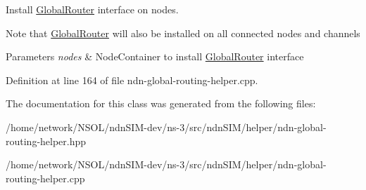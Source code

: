 Install \hyperlink{classns3_1_1ndn_1_1GlobalRouter}{Global\+Router} interface on nodes. 

Note that \hyperlink{classns3_1_1ndn_1_1GlobalRouter}{Global\+Router} will also be installed on all connected nodes and channels


\begin{DoxyParams}{Parameters}
{\em nodes} & Node\+Container to install \hyperlink{classns3_1_1ndn_1_1GlobalRouter}{Global\+Router} interface \\
\hline
\end{DoxyParams}


Definition at line 164 of file ndn-\/global-\/routing-\/helper.\+cpp.



The documentation for this class was generated from the following files\+:\begin{DoxyCompactItemize}
\item 
/home/network/\+N\+S\+O\+L/ndn\+S\+I\+M-\/dev/ns-\/3/src/ndn\+S\+I\+M/helper/ndn-\/global-\/routing-\/helper.\+hpp\item 
/home/network/\+N\+S\+O\+L/ndn\+S\+I\+M-\/dev/ns-\/3/src/ndn\+S\+I\+M/helper/ndn-\/global-\/routing-\/helper.\+cpp\end{DoxyCompactItemize}
